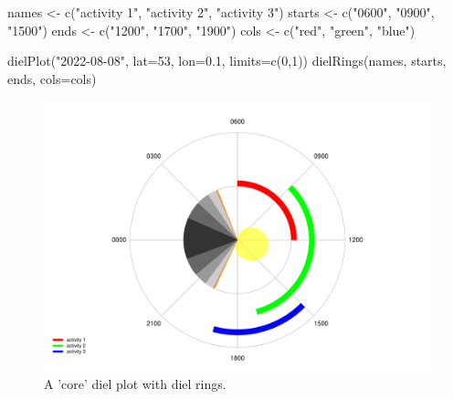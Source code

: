 \documentclass[
]{book}
\newenvironment{Shaded}{\begin{snugshade}}{\end{snugshade}}
\newcommand{\AttributeTok}[1]{\textcolor[rgb]{0.77,0.63,0.00}{#1}}
\newcommand{\DecValTok}[1]{\textcolor[rgb]{0.00,0.00,0.81}{#1}}
\newcommand{\FloatTok}[1]{\textcolor[rgb]{0.00,0.00,0.81}{#1}}
\newcommand{\FunctionTok}[1]{\textcolor[rgb]{0.00,0.00,0.00}{#1}}
\newcommand{\NormalTok}[1]{#1}
\newcommand{\OtherTok}[1]{\textcolor[rgb]{0.56,0.35,0.01}{#1}}
\newcommand{\StringTok}[1]{\textcolor[rgb]{0.31,0.60,0.02}{#1}}
\begin{document}
\begin{Shaded}
\begin{Highlighting}[]
\NormalTok{names }\OtherTok{\textless{}{-}} \FunctionTok{c}\NormalTok{(}\StringTok{"activity 1"}\NormalTok{, }\StringTok{"activity 2"}\NormalTok{, }\StringTok{"activity 3"}\NormalTok{)}
\NormalTok{starts }\OtherTok{\textless{}{-}} \FunctionTok{c}\NormalTok{(}\StringTok{"0600"}\NormalTok{, }\StringTok{"0900"}\NormalTok{, }\StringTok{"1500"}\NormalTok{)}
\NormalTok{ends }\OtherTok{\textless{}{-}} \FunctionTok{c}\NormalTok{(}\StringTok{"1200"}\NormalTok{, }\StringTok{"1700"}\NormalTok{, }\StringTok{"1900"}\NormalTok{)}
\NormalTok{cols }\OtherTok{\textless{}{-}} \FunctionTok{c}\NormalTok{(}\StringTok{"red"}\NormalTok{, }\StringTok{"green"}\NormalTok{, }\StringTok{"blue"}\NormalTok{)}

\FunctionTok{dielPlot}\NormalTok{(}\StringTok{"2022{-}08{-}08"}\NormalTok{, }\AttributeTok{lat=}\DecValTok{53}\NormalTok{, }\AttributeTok{lon=}\FloatTok{0.1}\NormalTok{, }\AttributeTok{limits=}\FunctionTok{c}\NormalTok{(}\DecValTok{0}\NormalTok{,}\DecValTok{1}\NormalTok{))}
\FunctionTok{dielRings}\NormalTok{(names, starts, ends, }\AttributeTok{cols=}\NormalTok{cols)}
\end{Highlighting}
\end{Shaded}

\begin{figure}

{\centering \includegraphics[width=0.9\linewidth]{_main_files/figure-latex/diel-plot-rings-1-1} 

}

\caption{A 'core' diel plot with diel rings.}\label{fig:diel-plot-rings-1}
\end{figure}
\end{document}
